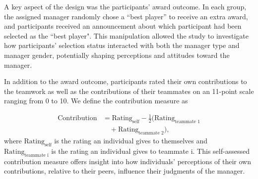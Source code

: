 \documentclass{article}
\begin{document}
{A key aspect of the design was the participants' award outcome. In each group, the assigned manager randomly chose a “best player” to receive an extra award, and participants received an announcement about which participant had been selected as the ``best player". This manipulation allowed the study to investigate how participants’ selection status interacted with both the manager type and manager gender, potentially shaping perceptions and attitudes toward the manager.

In addition to the award outcome, participants rated their own contributions to the teamwork as well as the contributions of their teammates on an 11-point scale ranging from 0 to 10. 
We define the contribution measure as

\begin{align*}
\text{Contribution} &= \text{Rating}_{\text{self}} - \frac{1}{2} \big( \text{Rating}_{\text{teammate 1}}  \\
&\quad + \text{Rating}_{\text{teammate 2}} \big),
\end{align*}
where $\text{Rating}_{\text{self}}$  is the rating an individual gives to themselves 
and $\text{Rating}_{\text{teammate i}}$  is the rating an individual gives to teammate i.
This self-assessed contribution measure offers insight into how individuals’ perceptions of their own contributions, relative to their peers, influence their judgments of the manager.

}
\end{document}
